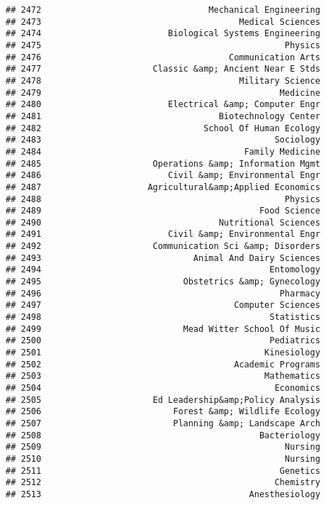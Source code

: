 \documentclass[
]{article}
\begin{document}
\begin{verbatim}
## 2472                                 Mechanical Engineering
## 2473                                       Medical Sciences
## 2474                         Biological Systems Engineering
## 2475                                                Physics
## 2476                                     Communication Arts
## 2477                      Classic &amp; Ancient Near E Stds
## 2478                                       Military Science
## 2479                                               Medicine
## 2480                         Electrical &amp; Computer Engr
## 2481                                   Biotechnology Center
## 2482                                School Of Human Ecology
## 2483                                              Sociology
## 2484                                        Family Medicine
## 2485                      Operations &amp; Information Mgmt
## 2486                         Civil &amp; Environmental Engr
## 2487                     Agricultural&amp;Applied Economics
## 2488                                                Physics
## 2489                                           Food Science
## 2490                                   Nutritional Sciences
## 2491                         Civil &amp; Environmental Engr
## 2492                      Communication Sci &amp; Disorders
## 2493                              Animal And Dairy Sciences
## 2494                                             Entomology
## 2495                            Obstetrics &amp; Gynecology
## 2496                                               Pharmacy
## 2497                                      Computer Sciences
## 2498                                             Statistics
## 2499                            Mead Witter School Of Music
## 2500                                             Pediatrics
## 2501                                            Kinesiology
## 2502                                      Academic Programs
## 2503                                            Mathematics
## 2504                                              Economics
## 2505                      Ed Leadership&amp;Policy Analysis
## 2506                          Forest &amp; Wildlife Ecology
## 2507                          Planning &amp; Landscape Arch
## 2508                                           Bacteriology
## 2509                                                Nursing
## 2510                                                Nursing
## 2511                                               Genetics
## 2512                                              Chemistry
## 2513                                         Anesthesiology

\end{verbatim}
\end{document}
